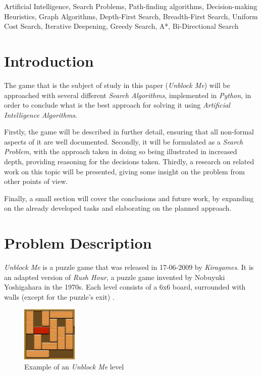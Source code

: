 \documentclass[conference]{IEEEtran}
\begin{document}
\begin{IEEEkeywords}
Artificial Intelligence, Search Problems, Path-finding algorithms, Decision-making Heuristics, Graph Algorithms, Depth-First Search, Breadth-First Search, Uniform Cost Search, Iterative Deepening, Greedy Search, A*, Bi-Directional Search
\end{IEEEkeywords}

\section{Introduction}
The game that is the subject of study in this paper (\textit{Unblock Me}) will be approached with several different \textit{Search Algorithms}, implemented in \textit{Python}, in order to conclude what is the best approach for solving it using \textit{Artificial Intelligence Algorithms}.

Firstly, the game will be described in further detail, ensuring that all non-formal aspects of it are well documented. Secondly, it will be formulated as a \textit{Search Problem}, with the approach taken in doing so being illustrated in increased depth, providing reasoning for the decisions taken. Thirdly, a research on related work on this topic will be presented, giving some insight on the problem from other points of view.

Finally, a small section will cover the conclusions and future work, by expanding on the already developed tasks and elaborating on the planned approach.

\section{Problem Description}
\textit{Unblock Me} is a puzzle game that was released in 17-06-2009 by \textit{Kiragames}. It is an adapted version of \textit{Rush Hour}, a puzzle game invented by Nobuyuki Yoshigahara in the 1970s. Each level consists of a 6x6 board, surrounded with walls (except for the puzzle's exit) \cite{b1}.

\begin{figure}[H]
    \centerline{\includegraphics[width=100px]{img1.png}}
    \caption{Example of an \textit{Unblock Me} level}
\end{figure}
\end{document}
